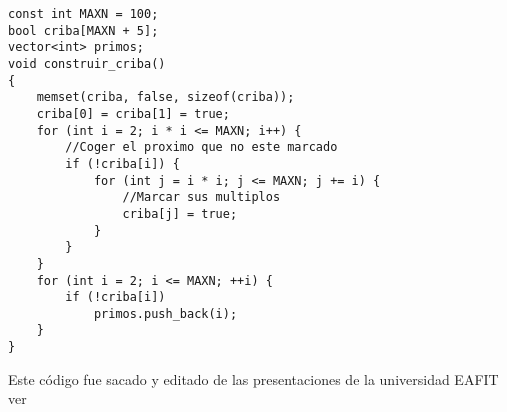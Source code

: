 \begin{lstlisting}[style=C,caption=criba.cpp]
const int MAXN = 100;
bool criba[MAXN + 5];
vector<int> primos;
void construir_criba()
{
    memset(criba, false, sizeof(criba));
    criba[0] = criba[1] = true;
    for (int i = 2; i * i <= MAXN; i++) {
        //Coger el proximo que no este marcado
        if (!criba[i]) {
            for (int j = i * i; j <= MAXN; j += i) {
                //Marcar sus multiplos
                criba[j] = true;
            }
        }
    }
    for (int i = 2; i <= MAXN; ++i) {
        if (!criba[i])
            primos.push_back(i);
    }
}
\end{lstlisting}
Este código fue sacado y editado de las presentaciones de la universidad EAFIT ver \cite{SemilleroProgramacion:Online}
